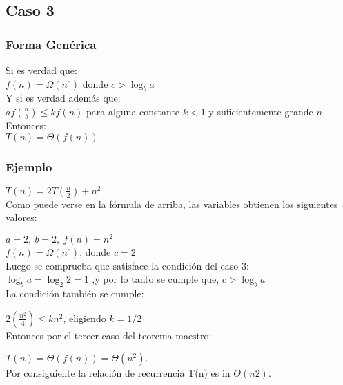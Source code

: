 \documentclass{article}
\begin{document}
        \subsection{Caso 3}
        \subsubsection{Forma Genérica}
        Si es verdad que:\\
        $f(n)=\Omega \left(n^{c}\right)$ donde $c>\log _{b}a$\\
        Y si es verdad además que:\\
        $af\left({\frac {n}{b}}\right)\leq kf(n)$ para alguna constante  $k<1$ y suficientemente grande $n$ \\
        Entonces:\\
        $T\left(n\right)=\Theta \left(f(n)\right)$
        \subsubsection{Ejemplo}
        $T(n)=2T\left({\frac {n}{2}}\right)+n^{2}$\\
        Como puede verse en la fórmula de arriba, las variables obtienen los siguientes valores:

$ a=2,\ b=2,\ f(n)=n^{2}$\\
$f(n)=\Omega \left(n^{c}\right)$, donde $ c=2$\\
Luego se comprueba que satisface la condición del caso 3:\\

$\log _{b}a=\log _{2}2=1$ ,y por lo tanto se cumple que, $c>\log _{b}a$\\
La condición también se cumple:

$2({\frac {n^{2}}{4}})\leq kn^{2}$, eligiendo $k=1/2$\\
Entonces por el tercer caso del teorema maestro:

$T\left(n\right)=\Theta \left(f(n)\right)=\Theta \left(n^{2}\right).$\\
Por consiguiente la relación de recurrencia T(n) es in $\Theta (n2).$
\end{document}
